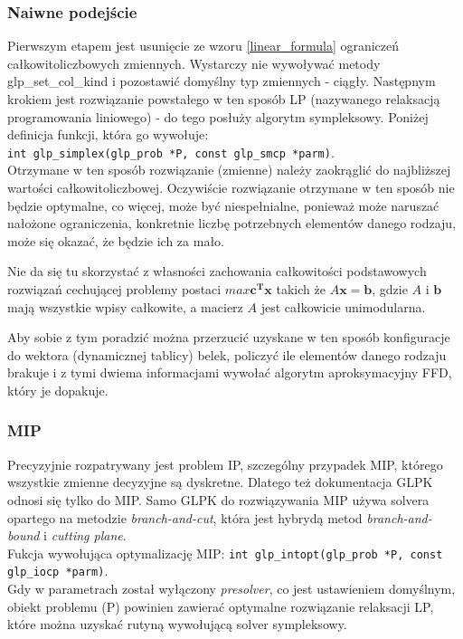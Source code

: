 \subsubsection{Naiwne podejście}
Pierwszym etapem jest usunięcie ze wzoru \ref{linear_formula} ograniczeń całkowitoliczbowych zmiennych. Wystarczy nie wywoływać metody glp\_set\_col\_kind i pozostawić domyślny typ zmiennych - ciągły. Następnym krokiem jest rozwiązanie powstałego w ten sposób LP (nazywanego relaksacją programowania liniowego) - do tego posłuży algorytm sympleksowy. Poniżej definicja funkcji, która go wywołuje:\\
\verb|int glp_simplex(glp_prob *P, const glp_smcp *parm)|. \\
Otrzymane w ten sposób rozwiązanie (zmienne) należy zaokrąglić do najbliższej wartości całkowitoliczbowej. 
Oczywiście rozwiązanie otrzymane w ten sposób nie będzie optymalne, co więcej, może być niespełnialne, ponieważ może naruszać nałożone ograniczenia, konkretnie liczbę potrzebnych elementów danego rodzaju, może się okazać, że będzie ich za mało.

Nie da się tu skorzystać z własności zachowania całkowitości podstawowych rozwiązań cechującej problemy postaci $max \mathbf{c^Tx}$ takich że $A\mathbf{x = b}$, gdzie $A$ i $\mathbf{b}$ mają wszystkie wpisy całkowite, a macierz $A$ jest całkowicie unimodularna.

Aby sobie z tym poradzić można przerzucić uzyskane w ten sposób konfiguracje do wektora (dynamicznej tablicy) belek, policzyć ile elementów danego rodzaju brakuje i z tymi dwiema informacjami wywołać algorytm aproksymacyjny FFD, który je dopakuje.

\subsubsection{MIP}
Precyzyjnie rozpatrywany jest problem IP, szczególny przypadek MIP, którego wszystkie zmienne decyzyjne są dyskretne.
Dlatego też dokumentacja GLPK odnosi się tylko do MIP. Samo GLPK do rozwiązywania MIP używa solvera opartego na metodzie \textit{branch-and-cut}, która jest hybrydą metod \textit{branch-and-bound} i \textit{cutting plane}. \\
Fukcja wywołująca optymalizację MIP: \verb|int glp_intopt(glp_prob *P, const glp_iocp *parm)|. \\
Gdy w parametrach został wyłączony \textit{presolver}, co jest ustawieniem domyślnym, obiekt problemu (P) powinien zawierać optymalne rozwiązanie relaksacji LP, które można uzyskać rutyną wywołującą solver sympleksowy.


